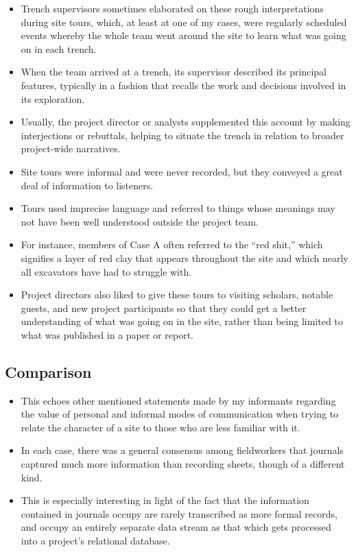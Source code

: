 \documentclass{article}
\begin{document}
\begin{itemize}
  \item Trench supervisors sometimes elaborated on these rough interpretations during site tours, which, at least at one of my cases, were regularly scheduled events whereby the whole team went around the site to learn what was going on in each trench.
  \item When the team arrived at a trench, its supervisor described its principal features, typically in a fashion that recalls the work and decisions involved in its exploration.
  \item Usually, the project director or analysts supplemented this account by making interjections or rebuttals, helping to situate the trench in relation to broader project-wide narratives.
  \item Site tours were informal and were never recorded, but they conveyed a great deal of information to listeners.
  \item Tours used imprecise language and referred to things whose meanings may not have been well understood outside the project team.
  \item For instance, members of Case A often referred to the “red shit,” which signifies a layer of red clay that appears throughout the site and which nearly all excavators have had to struggle with.
  
  \item Project directors also liked to give these tours to visiting scholars, notable guests, and new project participants so that they could get a better understanding of what was going on in the site, rather than being limited to what was published in a paper or report.
\end{itemize}

\subsection{Comparison}
\begin{itemize}
  \item This echoes other mentioned statements made by my informants regarding the value of personal and informal modes of communication when trying to relate the character of a site to those who are less familiar with it.

  \item In each case, there was a general consensus among fieldworkers that journals captured much more information than recording sheets, though of a different kind.

  \item This is especially interesting in light of the fact that the information contained in journals occupy are rarely transcribed as more formal records, and occupy an entirely separate data stream as that which gets processed into a project's relational database.
\end{itemize}
\end{document}
